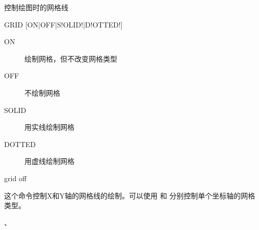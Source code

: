 \label{cmd:grid}

控制绘图时的网格线

\begin{SACSTX}
GRID [ON|OFF|S!OLID!|D!OTTED!]
\end{SACSTX}

\begin{description}
\item [ON] 绘制网格，但不改变网格类型
\item [OFF] 不绘制网格
\item [SOLID] 用实线绘制网格
\item [DOTTED] 用虚线绘制网格
\end{description}

\begin{SACDFT}
grid off
\end{SACDFT}

这个命令控制X和Y轴的网格线的绘制。可以使用  和
 分别控制单个坐标轴的网格类型。

、
